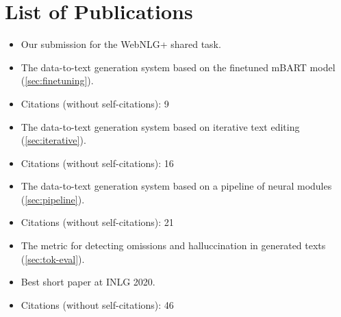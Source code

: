 \chapter*{List of Publications}



\noindent{}
\begin{itemize}[noitemsep,topsep=0pt]

    \item Our submission for the WebNLG+ shared task.
    \item The data-to-text generation system based on the finetuned mBART model (\autoref{sec:finetuning}).
    \item Citations (without self-citations): 9
\end{itemize}\vspace{.5\baselineskip}

\noindent{}
\begin{itemize}[noitemsep,topsep=0pt]
    \item The data-to-text generation system based on iterative text editing (\autoref{sec:iterative}).
    \item Citations (without self-citations): 16

\end{itemize}\vspace{.5\baselineskip}

\noindent{}
\begin{itemize}[noitemsep,topsep=0pt]
    \item The data-to-text generation system based on a pipeline of neural modules (\autoref{sec:pipeline}).
    \item Citations (without self-citations): 21

\end{itemize}\vspace{.5\baselineskip}

\noindent{}
\begin{itemize}[noitemsep,topsep=0pt]

    \item The metric for detecting omissions and halluccination in generated texts (\autoref{sec:tok-eval}).
    \item Best short paper at INLG 2020.
    \item Citations (without self-citations): 46

\end{itemize}\vspace{.5\baselineskip}


